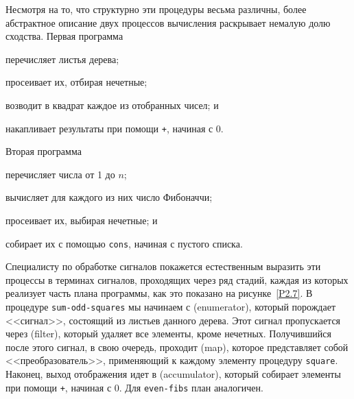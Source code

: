 Несмотря на то, что структурно эти процедуры весьма
различны, более абстрактное описание двух процессов вычисления
раскрывает немалую долю сходства. Первая программа

\begin{plainlist}


\item
перечисляет листья дерева;

\item
просеивает их, отбирая нечетные;

\item
возводит в квадрат каждое из отобранных чисел; и

\item
накапливает результаты при помощи {\tt +},
начиная с 0.
\end{plainlist}
Вторая программа

\begin{plainlist}


\item
перечисляет числа от 1 до $n$;

\item
вычисляет для каждого из них число Фибоначчи;

\item
просеивает их, выбирая нечетные; и

\item
собирает их с помощью {\tt cons}, начиная с
пустого списка.
\end{plainlist}

Специалисту по обработке сигналов покажется естественным
выразить эти процессы в терминах сигналов, проходящих через ряд
стадий, каждая из которых реализует часть плана программы, как это
показано на  
рисунке~\ref{P2.7}.  В процедуре
{\tt sum-odd-squares} мы начинаем с 
 (enumerator), который порождает <<сигнал>>, 
состоящий из листьев данного дерева.  Этот сигнал пропускается через
 (filter), который удаляет все элементы,
кроме нечетных.  Получившийся после этого сигнал, в свою очередь,
проходит 
 (map), которое
представляет собой <<преобразователь>>, применяющий к каждому элементу 
процедуру {\tt square}.  Наконец, выход отображения идет в 
 (accumulator), который собирает элементы при 
помощи {\tt +}, начиная с 0.  Для {\tt even-fibs} план
аналогичен.


